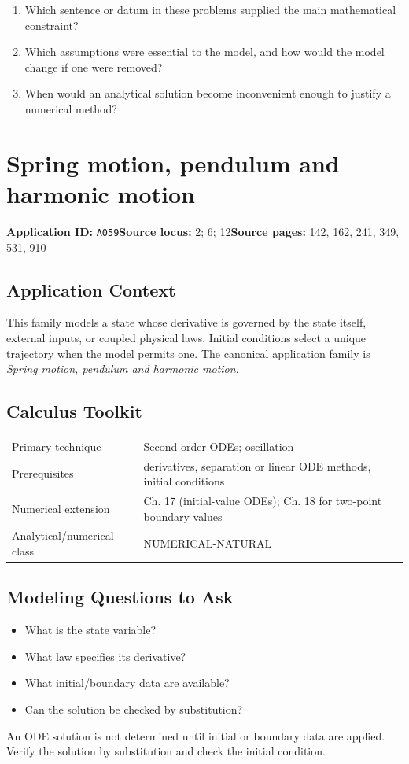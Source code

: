 \documentclass[11pt]{book}
\newcommand{\pid}[1]{\texttt{#1}}
\begin{document}
\begin{reflectionbox}\begin{enumerate}
\item Which sentence or datum in these problems supplied the main mathematical constraint?
\item Which assumptions were essential to the model, and how would the model change if one were removed?
\item When would an analytical solution become inconvenient enough to justify a numerical method?
\end{enumerate}\end{reflectionbox}
\chapter{Spring motion, pendulum and harmonic motion}\label{app:A059}
\textbf{Application ID:} \pid{A059}\quad \textbf{Source locus:} 2; 6; 12\quad \textbf{Source pages:} 142, 162, 241, 349, 531, 910
\section*{Application Context}
This family models a state whose derivative is governed by the state itself, external inputs, or coupled physical laws. Initial conditions select a unique trajectory when the model permits one. The canonical application family is \emph{Spring motion, pendulum and harmonic motion}.
\section*{Calculus Toolkit}
\begin{tabularx}{\textwidth}{@{}lX@{}}\toprule
Primary technique & Second-order ODEs; oscillation \\
Prerequisites & derivatives, separation or linear ODE methods, initial conditions \\
Numerical extension & Ch. 17 (initial-value ODEs); Ch. 18 for two-point boundary values \\
Analytical/numerical class & NUMERICAL-NATURAL \\
\bottomrule\end{tabularx}
\section*{Modeling Questions to Ask}\begin{itemize}
\item What is the state variable?
\item What law specifies its derivative?
\item What initial/boundary data are available?
\item Can the solution be checked by substitution?
\end{itemize}
\begin{errorbox}An ODE solution is not determined until initial or boundary data are applied. Verify the solution by substitution and check the initial condition.\end{errorbox}
\end{document}
